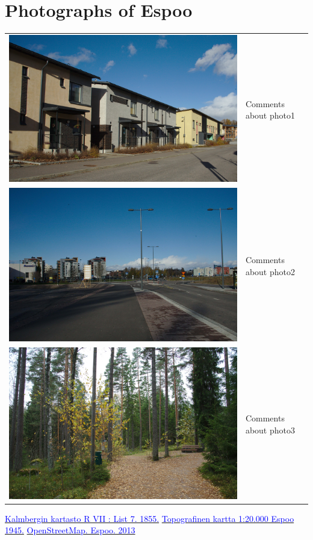 \documentclass[a4paper]{article}
\newcommand{\myhref}[2]{{\href{#1}{\textcolor{blue}{#2}}}}
\newcommand{\mycity}{Espoo\xspace}
\begin{document}
\section{Photographs of \mycity}
\begin{tabular}{lp{}}
\includegraphics[keepaspectratio,width=.5\textwidth]{traditional} & Comments about photo1\\[.2cm]
\includegraphics[keepaspectratio,width=.5\textwidth]{modern} & Comments about photo2\\[.2cm]
\includegraphics[keepaspectratio,width=.5\textwidth]{green} & Comments about photo3\\
\end{tabular}

\begin{thebibliography}{9}
 \myhref{http://www.vanhakartta.fi/historialliset-kartat/kaupunkikartat/sekalaiset-kaupunkikartat/@@mapview?handle=hdl_123456789_6888}{Kalmbergin kartasto R VII : List 7. 1855.}
 \myhref{http://koti.kapsi.fi/timomeriluoto/KARTAT/Topografiset\%20kartat/Topografinen\%20kartta\%201:20.000\%20Espoo\%201945.jpg}{Topografinen kartta 1:20.000 Espoo 1945.}
 \myhref{http://www.openstreetmap.org/\#map=14/60.2034/24.6415}{OpenStreetMap. Espoo. 2013}
\end{thebibliography}
\end{document}

